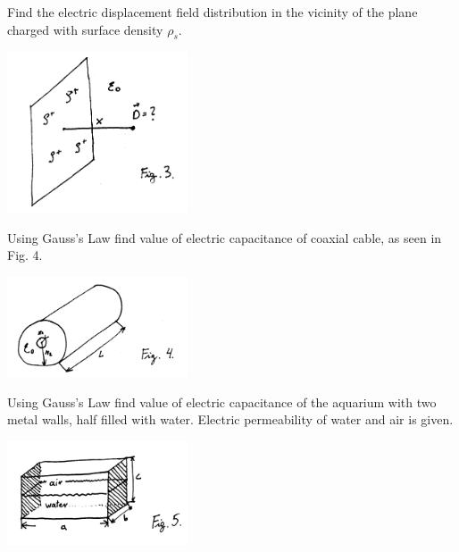 \begin{Exercise}[difficulty=3]
Find the electric displacement field distribution in the vicinity of the plane charged with surface density $\rho_s$.
\begin{center}
\includegraphics[width=0.4\textwidth]{img/fig_e3.png} 
\end{center}
\end{Exercise}

\begin{Exercise}[difficulty=2]
Using Gauss's Law find value of electric capacitance of coaxial cable, as seen in Fig. 4.
\begin{center}
\includegraphics[width=0.4\textwidth]{img/fig_e4.png} 
\end{center}
\end{Exercise}

\begin{Exercise}[difficulty=3]
Using Gauss's Law find value of electric capacitance of the aquarium with two metal walls, half filled with water. Electric permeability of water and air is given.
\begin{center}
\includegraphics[width=0.4\textwidth]{img/fig_e5.png} 
\end{center}
\end{Exercise}

